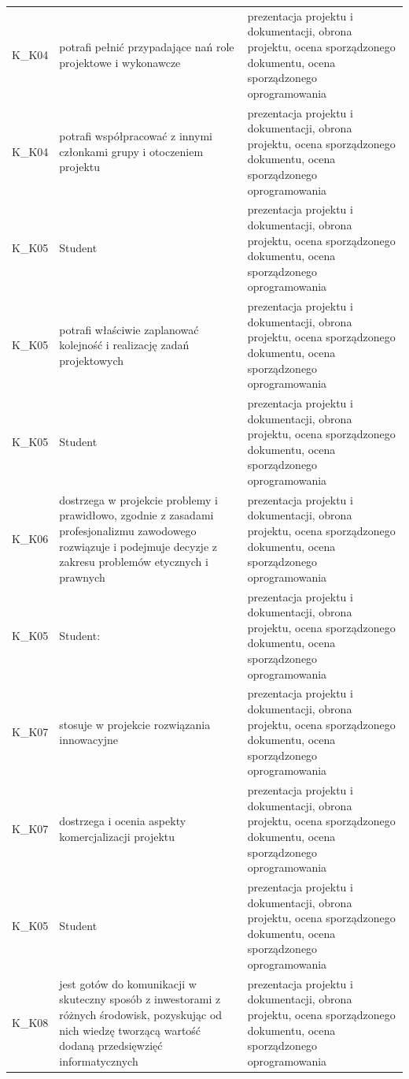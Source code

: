 \documentclass[12pt, a4paper]{article}
\begin{document}
{\begin{longtable}{m{1.6cm}m{9.0cm}m{4.2cm}}
  \rowcolor{tableRowAlt} K\_K04 & potrafi pełnić przypadające nań role projektowe i wykonawcze & prezentacja projektu i dokumentacji, obrona projektu, ocena sporządzonego dokumentu, ocena sporządzonego oprogramowania \\
  \rowcolor{tableRowLight} K\_K04 & potrafi współpracować z innymi członkami grupy i otoczeniem projektu & prezentacja projektu i dokumentacji, obrona projektu, ocena sporządzonego dokumentu, ocena sporządzonego oprogramowania \\
  \rowcolor{tableRowAlt} K\_K05 & Student & prezentacja projektu i dokumentacji, obrona projektu, ocena sporządzonego dokumentu, ocena sporządzonego oprogramowania \\
  \rowcolor{tableRowLight} K\_K05 & potrafi właściwie zaplanować kolejność i realizację zadań projektowych & prezentacja projektu i dokumentacji, obrona projektu, ocena sporządzonego dokumentu, ocena sporządzonego oprogramowania \\
  \rowcolor{tableRowAlt} K\_K05 & Student & prezentacja projektu i dokumentacji, obrona projektu, ocena sporządzonego dokumentu, ocena sporządzonego oprogramowania \\
  \rowcolor{tableRowLight} K\_K06 & dostrzega w projekcie problemy i prawidłowo, zgodnie z zasadami profesjonalizmu zawodowego rozwiązuje i podejmuje decyzje z zakresu problemów etycznych i prawnych & prezentacja projektu i dokumentacji, obrona projektu, ocena sporządzonego dokumentu, ocena sporządzonego oprogramowania \\
  \rowcolor{tableRowAlt} K\_K05 & Student: & prezentacja projektu i dokumentacji, obrona projektu, ocena sporządzonego dokumentu, ocena sporządzonego oprogramowania \\
  \rowcolor{tableRowLight} K\_K07 & stosuje w projekcie rozwiązania innowacyjne & prezentacja projektu i dokumentacji, obrona projektu, ocena sporządzonego dokumentu, ocena sporządzonego oprogramowania \\
  \rowcolor{tableRowAlt} K\_K07 & dostrzega i ocenia aspekty komercjalizacji projektu & prezentacja projektu i dokumentacji, obrona projektu, ocena sporządzonego dokumentu, ocena sporządzonego oprogramowania \\
  \rowcolor{tableRowLight} K\_K05 & Student & prezentacja projektu i dokumentacji, obrona projektu, ocena sporządzonego dokumentu, ocena sporządzonego oprogramowania \\
  \rowcolor{tableRowAlt} K\_K08 & jest gotów do komunikacji w skuteczny sposób z inwestorami z różnych środowisk, pozyskując od nich wiedzę tworzącą wartość dodaną przedsięwzięć informatycznych & prezentacja projektu i dokumentacji, obrona projektu, ocena sporządzonego dokumentu, ocena sporządzonego oprogramowania \\
\bottomrule
\end{longtable}}
\end{document}
